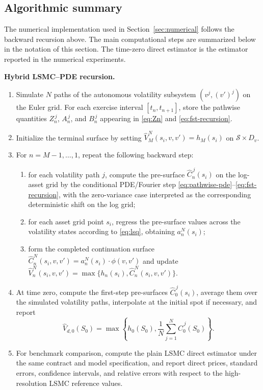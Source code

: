 \documentclass[10pt]{article}
\theoremstyle{plain}
\theoremstyle{definition}
\theoremstyle{remark}
\begin{document}
\subsection{Algorithmic summary}
\label{subsec:algorithmic-summary}
The numerical implementation used in Section~\ref{sec:numerical} follows the backward recursion above. The main computational steps are summarized below in the notation of this section. The time-zero direct estimator is the estimator reported in the numerical experiments.
\begin{center}
\begin{minipage}{0.96\textwidth}
\small
\noindent\textbf{Hybrid LSMC--PDE recursion.}
\begin{enumerate}
\item Simulate $N$ paths of the autonomous volatility subsystem $(v^j,(v')^j)$ on the Euler grid. For each exercise interval $[t_n,t_{n+1}]$, store the pathwise quantities $Z_n^{\,j}$, $A_n^{\,j}$, and $B_n^{\,j}$ appearing in \eqref{eq:Zn} and \eqref{eq:fst-recursion}.
\item Initialize the terminal surface by setting $\widehat V_M^{N}(s_i,v,v')=h_M(s_i)$ on $\mathcal S\times D_v$.
\item For $n=M-1,\dots,1$, repeat the following backward step:
\begin{enumerate}
\item for each volatility path $j$, compute the pre-surface $\widehat C_n^{\,j}(s_i)$ on the log-asset grid by the conditional PDE/Fourier step \eqref{eq:pathwise-pde}--\eqref{eq:fst-recursion}, with the zero-variance case interpreted as the corresponding deterministic shift on the log grid;
\item for each asset grid point $s_i$, regress the pre-surface values across the volatility states according to \eqref{eq:lsq}, obtaining $a_n^N(s_i)$;
\item form the completed continuation surface $\widehat C_n^{N}(s_i,v,v')=a_n^N(s_i)\cdot\phi(v,v')$ and update $\widehat V_n^{N}(s_i,v,v')=\max\{h_n(s_i),\widehat C_n^{N}(s_i,v,v')\}$.
\end{enumerate}
\item At time zero, compute the first-step pre-surfaces $\widehat C_0^{\,j}(s_i)$, average them over the simulated volatility paths, interpolate at the initial spot if necessary, and report
\[
\widehat V_{d,0}(S_0)
=
\max\left\{h_0(S_0),\frac1N\sum_{j=1}^N \widehat C_0^{\,j}(S_0)\right\}.
\]
\item For benchmark comparison, compute the plain LSMC direct estimator under the same contract and model specification, and report direct prices, standard errors, confidence intervals, and relative errors with respect to the high-resolution LSMC reference values.
\end{enumerate}
\end{minipage}
\end{center}
\end{document}

